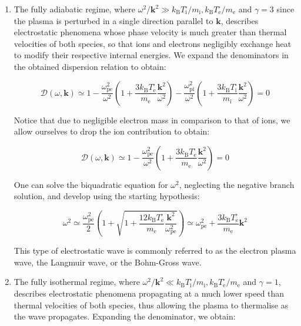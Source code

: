 \begin{enumerate}
    \item The fully adiabatic regime, where $\omega^2/\mathbf{k}^2\gg k_\mathrm{B}T_\mathrm{i}^\square/m_\mathrm{i}, k_\mathrm{B}T_\text{e}^\square/m_\text{e}$ and $\gamma=3$ since the plasma is perturbed in a single direction parallel to $\mathbf{k}$, describes electrostatic phenomena whose phase velocity is much greater than thermal velocities of both species, so that ions and electrons negligibly exchange heat to modify their respective internal energies. We expand the denominators in the obtained dispersion relation to obtain:

    \begin{equation}
        \mathcal{D}(\omega,\mathbf{k})\simeq1-\frac{\omega_{\text{pe}}^2}{\omega^2}\left(1+\frac{3k_\mathrm{B}T_\text{e}^\square}{m_\text{e}}\frac{\mathbf{k}^2}{\omega^2}\right)-\frac{\omega_\text{pi}^2}{\omega^2}\left(1+\frac{3k_\mathrm{B}T_\mathrm{i}^\square}{m_\mathrm{i}}\frac{\mathbf{k}^2}{\omega^2}\right)=0
    \end{equation}

    Notice that due to negligible electron mass in comparison to that of ions, we allow ourselves to drop the ion contribution to obtain:

    \begin{equation}
        \mathcal{D}(\omega,\mathbf{k})\simeq1-\frac{\omega_\text{pe}^2}{\omega^2}\left(1+\frac{3k_\mathrm{B}T_\text{e}^\square}{m_\text{e}}\frac{\mathbf{k}^2}{\omega^2}\right)=0
    \end{equation}

    One can solve the biquadratic equation for $\omega^2$, neglecting the negative branch solution, and develop using the starting hypothesis:
    
    \begin{equation}
        \omega^2\simeq\frac{\omega_\text{pe}^2}{2}\left(1+\sqrt{1+\frac{12k_\mathrm{B}T_\text{e}^\square}{m_\text{e}}\frac{\mathbf{k}^2}{\omega_\text{pe}^2}}\right)\simeq\omega_\text{pe}^2+\frac{3k_\mathrm{B}T_\text{e}^\square}{m_\text{e}}\mathbf{k}^2
    \end{equation}

    This type of electrostatic wave is commonly referred to as the electron plasma wave, the Langmuir wave, or the Bohm-Gross wave.

    \item The fully isothermal regime, where $\omega^2/\mathbf{k}^2\ll k_\mathrm{B}T_\mathrm{i}^\square/m_\mathrm{i}, k_\mathrm{B}T_\text{e}^\square/m_\text{e}$ and $\gamma=1$, describes electrostatic phenomena propagating at a much lower speed than thermal velocities of both species, thus allowing the plasma to thermalise as the wave propagates. Expanding the denominator, we obtain:


\end{enumerate}
